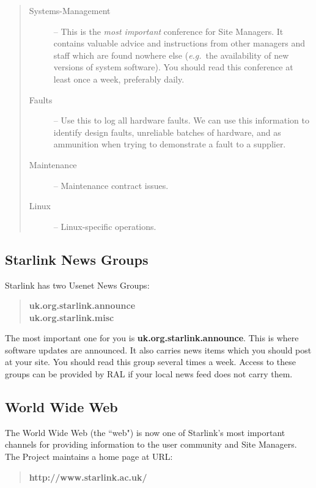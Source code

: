 \documentclass[twoside,11pt]{article}
\newcommand{\htmladdnormallink}[2]{#1}
\begin{document}
\begin{quote}
\begin{description}
\item [Systems-Management] --
 This is the {\em most important} conference for Site Managers.
 It contains valuable advice and instructions from other managers and
 staff which are found nowhere else ({\em e.g.}\ the availability of new
 versions of system software).
 You should read this conference at least once a week, preferably daily.
\item [Faults] --
 Use this to log all hardware faults.
 We can use this information to identify design faults, unreliable batches of
 hardware, and as ammunition when trying to demonstrate a fault to a supplier. 
\item [Maintenance] --
 Maintenance contract issues.
\item [Linux] --
 Linux-specific operations.
\end{description}
\end{quote}

\subsection{Starlink News Groups}

Starlink has two Usenet News Groups:

\begin{quote}
{\bf uk.org.starlink.announce\\
     uk.org.starlink.misc}
\end{quote}

The most important one for you is {\bf uk.org.starlink.announce}.
This is where software updates are announced.
It also carries news items which you should post at your site.
You should read this group several times a week. 
Access to these groups can be provided by RAL if your local news feed
does not carry them.

\subsection{\label{web}World Wide Web}

The World Wide Web (the ``web") is now one of Starlink's most important
channels for providing information to the user community and Site Managers.
The Project maintains a home page at URL:

\begin{quote}
\htmladdnormallink{{\bf http://www.starlink.ac.uk/}}{http://www.starlink.ac.uk/}
\end{quote}
\end{document}
